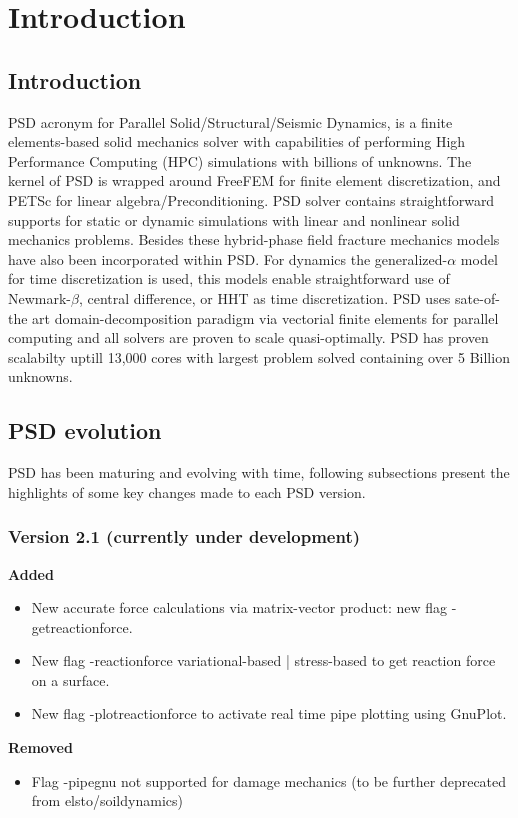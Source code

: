 \chapter{Introduction} 

\section{Introduction} 
PSD acronym for Parallel Solid/Structural/Seismic Dynamics, is a finite elements-based solid mechanics solver with capabilities of performing High Performance Computing (HPC) simulations with billions of unknowns. The kernel of PSD is wrapped around FreeFEM for finite element discretization, and PETSc for linear algebra/Preconditioning. PSD solver contains straightforward supports for static or dynamic simulations with linear  and nonlinear solid mechanics problems. Besides these hybrid-phase field fracture mechanics models have also been incorporated within PSD. For dynamics the generalized-$\alpha$ model  for time discretization is used, this models enable straightforward use of Newmark-$\beta$, central difference, or HHT as time discretization. PSD uses sate-of-the art domain-decomposition paradigm via vectorial finite elements for parallel computing and all solvers are  proven to scale quasi-optimally. PSD has proven scalabilty uptill 13,000 cores with largest problem solved containing over 5 Billion unknowns.

\section{PSD evolution}
PSD has been maturing and evolving with time, following subsections present the highlights of  some key changes made to each PSD version. 

\subsection{Version 2.1 (currently under development)}
\textbf{Added}
\begin{itemize}
    \item New accurate force calculations via matrix-vector product: new flag {\ttfamily -getreactionforce}.
    \item New flag {\ttfamily -reactionforce} variational-based | stress-based to get reaction force on a surface.
    \item New flag {\ttfamily -plotreactionforce} to activate real time pipe plotting using GnuPlot. 
\end{itemize}
\textbf{Removed}
\begin{itemize}
    \item Flag {\ttfamily-pipegnu} not supported for damage mechanics (to be further deprecated from elsto/soildynamics) 
\end{itemize}
